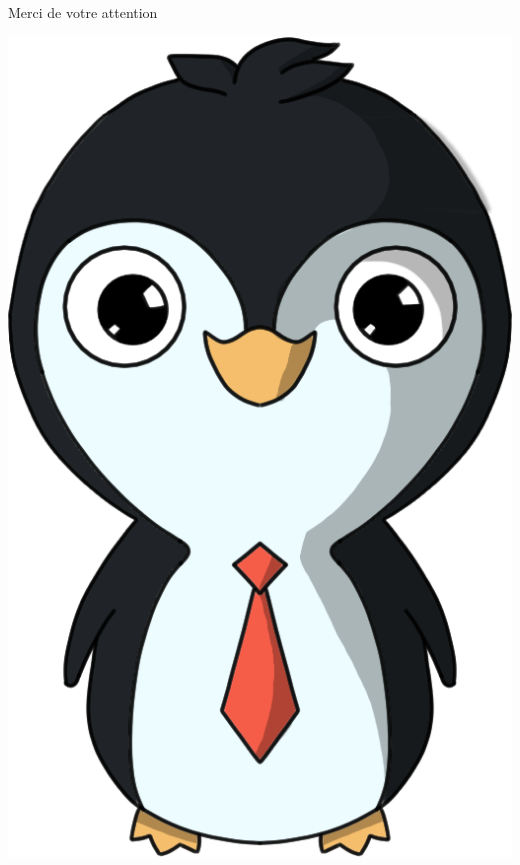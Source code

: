 \documentclass{beamer}
\begin{document}
\begin{frame}
 \begin{center}
  \Huge Merci de votre attention
 \end{center}
 \begin{center}
  \includegraphics[scale=0.55]{pingouin}
 \end{center}
\end{frame}
\end{document}

